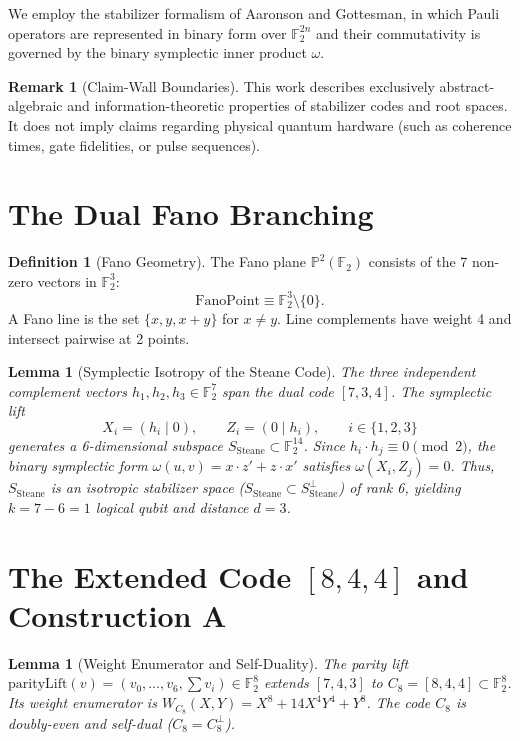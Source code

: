 \documentclass[11pt,a4paper]{article}
\newtheorem{lemma}[theorem]{Lemma}
\theoremstyle{definition}
\newtheorem{definition}[theorem]{Definition}
\newtheorem{remark}[theorem]{Remark}
\begin{document}
	We employ the stabilizer formalism of Aaronson and Gottesman, in which Pauli operators are represented in binary form over $\mathbb{F}_2^{2n}$ and their commutativity is governed by the binary symplectic inner product $\omega$.
	
	\begin{remark}[Claim-Wall Boundaries]
		This work describes exclusively abstract-algebraic and information-theoretic properties of stabilizer codes and root spaces. It does not imply claims regarding physical quantum hardware (such as coherence times, gate fidelities, or pulse sequences).
	\end{remark}
	
	\section{The Dual Fano Branching}
	
	\begin{definition}[Fano Geometry]
		The Fano plane $\mathbb{P}^2(\mathbb{F}_2)$ consists of the 7 non-zero vectors in $\mathbb{F}_2^3$:
		\[
		\mathrm{FanoPoint} \equiv \mathbb{F}_2^3 \setminus \{0\}.
		\]
		A Fano line is the set $\{x, y, x+y\}$ for $x \neq y$. Line complements have weight 4 and intersect pairwise at 2 points.
	\end{definition}
	
	\begin{lemma}[Symplectic Isotropy of the Steane Code]
		The three independent complement vectors $h_1, h_2, h_3 \in \mathbb{F}_2^7$ span the dual code $[7,3,4]$. The symplectic lift
		\[
		X_i = (h_i \mid 0), \qquad Z_i = (0 \mid h_i), \qquad i \in \{1,2,3\}
		\]
		generates a 6-dimensional subspace $S_{\mathrm{Steane}} \subset \mathbb{F}_2^{14}$. Since $h_i \cdot h_j \equiv 0 \pmod 2$, the binary symplectic form $\omega(u,v) = x \cdot z' + z \cdot x'$ satisfies $\omega(X_i, Z_j) = 0$. Thus, $S_{\mathrm{Steane}}$ is an isotropic stabilizer space ($S_{\mathrm{Steane}} \subset S_{\mathrm{Steane}}^\perp$) of rank 6, yielding $k = 7 - 6 = 1$ logical qubit and distance $d = 3$.
	\end{lemma}
	
	\section{The Extended Code $[8,4,4]$ and Construction A}
	
	\begin{lemma}[Weight Enumerator and Self-Duality]
		The parity lift $\mathrm{parityLift}(v) = (v_0, \dots, v_6, \sum v_i) \in \mathbb{F}_2^8$ extends $[7,4,3]$ to $C_8 = [8,4,4] \subset \mathbb{F}_2^8$. Its weight enumerator is $W_{C_8}(X,Y) = X^8 + 14X^4Y^4 + Y^8$. The code $C_8$ is doubly-even and self-dual ($C_8 = C_8^\perp$).
	\end{lemma}
	
\end{document}
